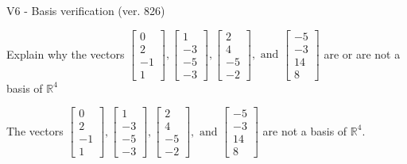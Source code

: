 \begin{exercise}
  \begin{exerciseTitle}V6 - Basis verification (ver. 826)\end{exerciseTitle}
  \begin{exerciseStatement}
    Explain why the vectors \(\left[\begin{array}{r}
0 \\
2 \\
-1 \\
1
\end{array}\right] , \left[\begin{array}{r}
1 \\
-3 \\
-5 \\
-3
\end{array}\right] , \left[\begin{array}{r}
2 \\
4 \\
-5 \\
-2
\end{array}\right] , \text{ and } \left[\begin{array}{r}
-5 \\
-3 \\
14 \\
8
\end{array}\right]\) are or are not a basis of \(\mathbb{R}^4\)	


  \end{exerciseStatement}
  \begin{exerciseAnswer}
   The vectors \(\left[\begin{array}{r}
0 \\
2 \\
-1 \\
1
\end{array}\right] , \left[\begin{array}{r}
1 \\
-3 \\
-5 \\
-3
\end{array}\right] , \left[\begin{array}{r}
2 \\
4 \\
-5 \\
-2
\end{array}\right] , \text{ and } \left[\begin{array}{r}
-5 \\
-3 \\
14 \\
8
\end{array}\right]\) 
  	 are not  a basis of \(\mathbb{R}^4\).
  


  \end{exerciseAnswer}
\end{exercise}